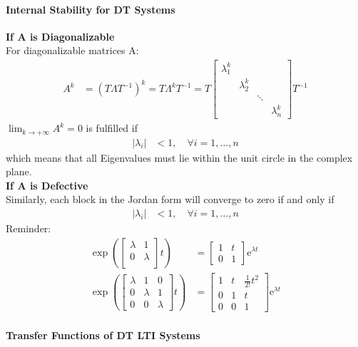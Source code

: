 \paragraph{Internal Stability for DT Systems}
\textbf{If A is Diagonalizable}\\
For diagonalizable matrices A:
\noindent\begin{align*}
    A^k & =(T\Lambda T^{-1})^k=T\Lambda^kT^{-1}=T\begin{bmatrix}\lambda_1^k&&&\\&\lambda_2^k&&\\&&\ddots&\\&&&\lambda_n^k\end{bmatrix}T^{-1}
\end{align*}
$\lim_{k\to+\infty}A^k=0$ is fulfilled if
\noindent\begin{align*}
    |\lambda_i| & <1,\quad\forall i=1,\ldots,n
\end{align*}
which means that all Eigenvalues must lie within the unit circle in the complex plane.\\
\textbf{If A is Defective}\\
Similarly, each block in the Jordan form will converge to zero if and only if
\noindent\begin{align*}
    |\lambda_i| & <1,\quad\forall i=1,\ldots,n
\end{align*}
Reminder:
\noindent\begin{align*}
    \left.\exp\left(\begin{bmatrix}\lambda&1\\ 0&\lambda\\\end{bmatrix}\right.t\right) &=\begin{bmatrix}1&t\\0&1\end{bmatrix}\text{e}^{\lambda t} \\
    \left.\exp\left(\begin{bmatrix}\lambda&1&0\\0&\lambda&1\\0&0&\lambda\end{bmatrix}\right.t\right) &=\begin{bmatrix}1&t&\frac{1}{2!}t^2\\0&1&t\\0&0&1\end{bmatrix}\text{e}^{\lambda t}
\end{align*}
%
\paragraph{Transfer Functions of DT LTI Systems}



\noindent\begin{align*}
\end{align*}
\noindent\begin{align*}
\end{align*}
\noindent\begin{align*}
\end{align*}
\noindent\begin{align*}
\end{align*}



